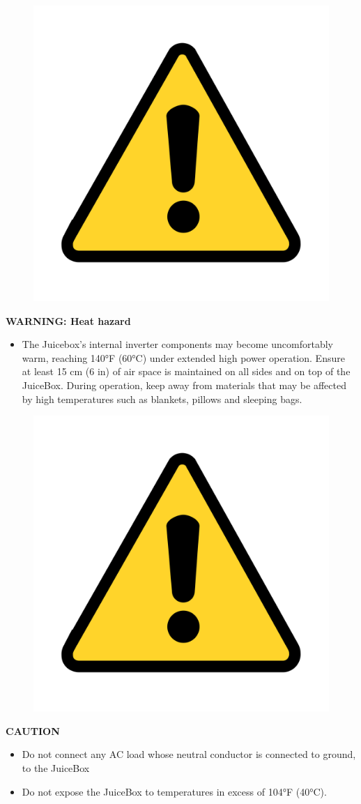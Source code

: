 \documentclass[10pt]{article}
\begin{document}
\begin{figure}
    \centering
    \includegraphics[width=.75in]{warning_y}
\end{figure}

\vspace{5mm}

\noindent
\Large{\textbf{WARNING: Heat hazard}} \\
\begin{large}                                        
	\begin{itemize}
		\item{ The Juicebox's internal inverter components may become uncomfortably warm,
			reaching 140°F (60°C) under extended high power operation. Ensure at least
			15 cm (6 in) of air space is maintained on all sides and on top of the JuiceBox.
			During operation, keep away from materials that may be affected by high
			temperatures such as blankets, pillows and sleeping bags.}
	\end{itemize}
\end{large}


\begin{figure}
    \centering
    \includegraphics[width=.75in]{warning_y}
\end{figure}

\vspace{5mm}

\noindent   
\Large{\textbf{CAUTION}} \\
\begin{large}                                        
	\begin{itemize}
		\item{Do not connect any AC load whose neutral conductor is connected to ground,
			to the JuiceBox}
		\item{Do not expose the JuiceBox to temperatures in excess of 104°F (40°C).}
	\end{itemize}
\end{large}

\newpage
\tableofcontents
\end{document}
